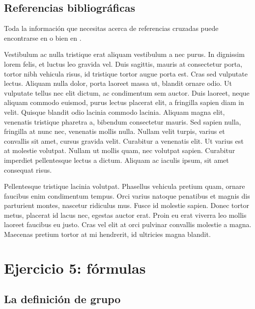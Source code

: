 \documentclass[a4paper,10pt]{article}
\theoremstyle{teorema}
\theoremstyle{plano}
\theoremstyle{titulo}
\begin{document}
\subsection{Referencias bibliográficas}\label{subsec:1.3}

Toda la información que necesitas acerca de referencias cruzadas puede encontrarse en \cite{knuth} o bien en \cite[Sección 2.8]{oetiker}.

Vestibulum ac nulla tristique erat aliquam vestibulum a nec purus. In dignissim lorem felis, et luctus leo gravida vel. Duis sagittis, mauris at consectetur porta, tortor nibh vehicula risus, id tristique tortor augue porta est. Cras sed vulputate lectus. Aliquam nulla dolor, porta laoreet massa ut, blandit ornare odio. Ut vulputate tellus nec elit dictum, ac condimentum sem auctor. Duis laoreet, neque aliquam commodo euismod, purus lectus placerat elit, a fringilla sapien diam in velit. Quisque blandit odio lacinia commodo lacinia. Aliquam magna elit, venenatis tristique pharetra a, bibendum consectetur mauris. Sed sapien nulla, fringilla at nunc nec, venenatis mollis nulla. Nullam velit turpis, varius et convallis sit amet, cursus gravida velit. Curabitur a venenatis elit. Ut varius est at molestie volutpat. Nullam ut mollis quam, nec volutpat sapien. Curabitur imperdiet pellentesque lectus a dictum. Aliquam ac iaculis ipsum, sit amet consequat risus.

Pellentesque tristique lacinia volutpat. Phasellus vehicula pretium quam, ornare faucibus enim condimentum tempus. Orci varius natoque penatibus et magnis dis parturient montes, nascetur ridiculus mus. Fusce id molestie sapien. Donec tortor metus, placerat id lacus nec, egestas auctor erat. Proin eu erat viverra leo mollis laoreet faucibus eu justo. Cras vel elit at orci pulvinar convallis molestie a magna. Maecenas pretium tortor at mi hendrerit, id ultricies magna blandit.

\section{Ejercicio 5: fórmulas}

\subsection{La definición de grupo}
\end{document}
